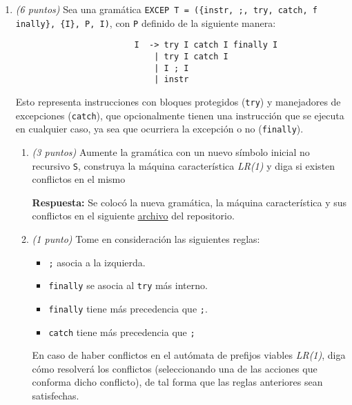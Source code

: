 \documentclass[a4paper,10pt]{article}
\begin{document}
    \begin{enumerate}
        \item \textit{(6 puntos)} Sea una gram\'atica \verb|EXCEP T = ({instr, ;, try, catch, f inally}, {I}, P, I)|, 
        con \verb|P| definido de la siguiente manera:

        \begin{verbatim}
                        I  -> try I catch I finally I
                            | try I catch I
                            | I ; I
                            | instr
        \end{verbatim}
        Esto representa instrucciones con bloques protegidos (\verb|try|) y manejadores de excepciones 
        (\verb|catch|), que opcionalmente tienen una instrucci\'on que se ejecuta en cualquier caso, ya 
        sea que ocurriera la excepci\'on o no (\verb|finally|). 

        \begin{enumerate}
            \item \textit{(3 puntos)} Aumente la gram\'atica con un nuevo s\'imbolo inicial no recursivo \verb|S|, 
            construya la m\'aquina caracter\'istica \textit{LR(1)} y diga si existen conflictos en el mismo

            \textbf{Respuesta:} Se coloc\'o la nueva gram\'atica, la m\'aquina caracter\'istica y sus conflictos 
            en el siguiente \href{https://github.com/ArriagaAmin/LenguajesIIParcial1/blob/main/Pregunta1/MC_LR1}{archivo} 
            del repositorio.\\

            \item \textit{(1 punto)} Tome en consideraci\'on las siguientes reglas:
            \begin{itemize}
                \item \verb|;| asocia a la izquierda.
                \item \verb|finally| se asocia al \verb|try| m\'as interno.
                \item \verb|finally| tiene m\'as precedencia que \verb|;|.
                \item \verb|catch| tiene m\'as precedencia que \verb|;|
            \end{itemize}
            En caso de haber conflictos en el aut\'omata de prefijos viables \textit{LR(1)}, diga c\'omo 
            resolver\'a los conflictos (seleccionando una de las acciones que conforma dicho conflicto), 
            de tal forma que las reglas anteriores sean satisfechas.


\end{enumerate}
\end{enumerate}
\end{document}
